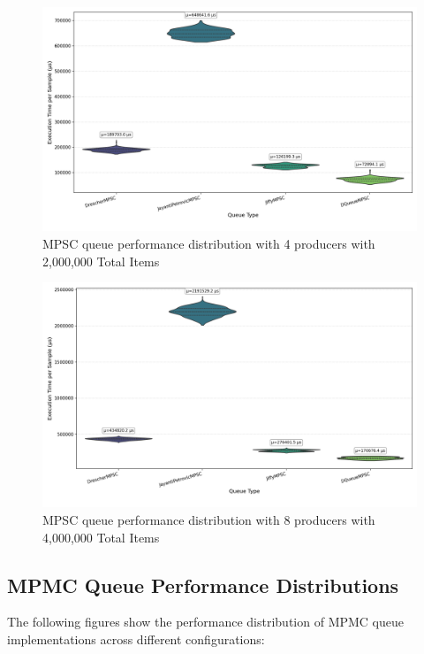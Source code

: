\begin{figure}[H]
\centering
\caption{MPSC queue performance distribution with 4 producers with 2,000,000 Total Items}
\label{fig:mpsc-violin-4p}
\includegraphics[width=\textwidth]{images/results/mpsc_performance_violin_4_producers.png}
\end{figure}

\begin{figure}[H]
\centering
\caption{MPSC queue performance distribution with 8 producers with 4,000,000 Total Items}
\label{fig:mpsc-violin-8p}
\includegraphics[width=\textwidth]{images/results/mpsc_performance_violin_8_producers.png}
\end{figure}

\subsection{MPMC Queue Performance Distributions}
The following figures show the performance distribution of MPMC queue implementations across different configurations:


